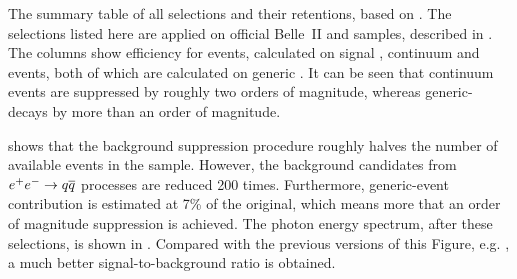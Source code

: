 \begin{table}[hbtp!]
    \centering
    \caption{\label{tab:cutflow} The summary table of all selections and their retentions, based on .
    The selections listed here are applied on official Belle~II \feiBp and \feiBz samples, described in .
    The columns show efficiency for \BtoXsgamma events, calculated on signal \MC, continuum and \BB events, both of which are calculated on generic \MC.
    It can be seen that continuum events are suppressed by roughly two orders of magnitude, whereas generic-\BB decays by more than an order of magnitude.
    }
    
\end{table}

 shows that the background suppression procedure roughly halves the number of available \BtoXsgamma events in the sample.
However, the background candidates from \mbox{$e^+e^-\rightarrow q\overline q$} processes are reduced 200 times.
Furthermore, generic-\BB event contribution is estimated at 7\% of the original, which means more that an order of magnitude suppression is achieved.
The photon energy spectrum, after these selections, is shown in .
Compared with the previous versions of this Figure, e.g. , a much better signal-to-background ratio is obtained.


